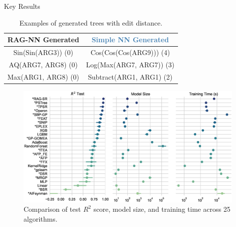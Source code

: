 \documentclass[final]{beamer}
\newcommand{\hlpurple}[1]{\textcolor{deepplum}{#1}}
\newcommand{\hlsteel}[1]{\textcolor{steelblue}{#1}}
\newlength{\onecolwid}
\begin{document}
\begin{frame}[t]
\begin{columns}[t]
\begin{column}{\onecolwid}
                \begin{block}{Key Results}
                    \begin{table}
                        \centering
                        \small
                        \begin{tabular}{cc}
                            \toprule
                            \textbf{\hlpurple{RAG-NN Generated}} & \textbf{\hlsteel{Simple NN Generated}} \\
                            \midrule
                            Sin(Sin(ARG3)) (0)                   & Cos(Cos(Cos(ARG9))) (4)                \\
                            AQ(ARG7, ARG8) (0)                   & Log(Max(ARG7, ARG7)) (3)               \\
                            Max(ARG1, ARG8) (0)                  & Subtract(ARG1, ARG1) (2)               \\
                            \bottomrule
                        \end{tabular}
                        \caption{Examples of generated trees with edit distance.}
                    \end{table}
                    \vspace{-5mm}

                    \begin{figure}
                        \centering
                        \includegraphics[width=\linewidth, trim=5 5 5 5, clip]{figs/pairgrid-pointplot_r2_test_model_size_training-time-(s).eps}
                        \caption{Comparison of test $R^2$ score, model size, and training time across 25 algorithms.}
                    \end{figure}



\end{block}
\end{column}
\end{columns}
\end{frame}
\end{document}
